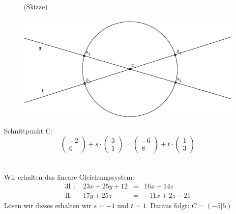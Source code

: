 \documentclass[12pt,a4paper]{scrbook}
\begin{document}
\begin{figure}[h]
	(Skizze)\\\\
	\centering
	\includegraphics[scale=1.2]{img/parameter_geometrie.pdf}\\
\end{figure}

Schnittpunkt C:\\
\[ \left(\begin{array}{c}-2\\6\end{array}\right) + s \cdot \left(\begin{array}{c}3\\1\end{array}\right) = \left(\begin{array}{c}-6\\8\end{array}\right) + t \cdot \left(\begin{array}{c}1\\3\end{array}\right)\]\\
\\
Wir erhalten das lineare Gleichungssystem:
\begin{alignat}{3}
\text{I :  } & 23x+25y+12 & = & 16x + 14z \nonumber \\
\text{II:  } & 17y+25z & = & -11x + 2z - 21 \nonumber
\end{alignat}
Lösen wir dieses erhalten wir $s=-1$ und $t=1$. Daraus folgt: $C = (-5 \vert 5)$
\end{document}
